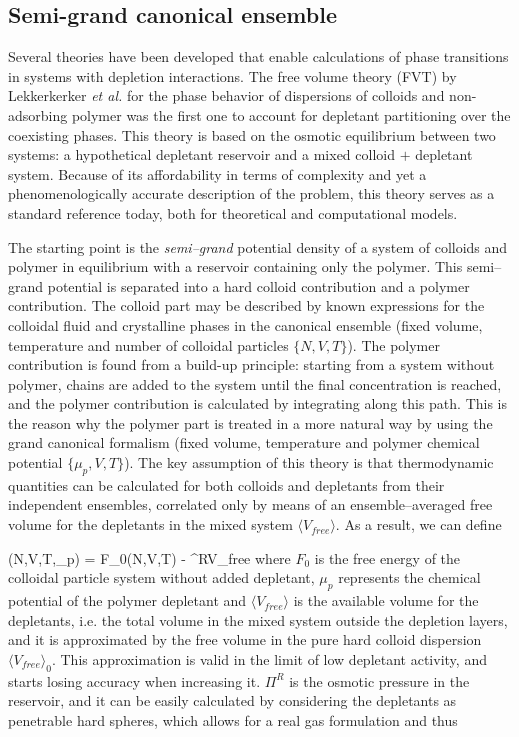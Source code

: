 \subsection{Semi-grand canonical ensemble}

Several theories have been developed that enable calculations of phase transitions in systems with depletion interactions. The free volume theory (FVT) by Lekkerkerker {\em et al.} \cite{sphere+polymer} for the phase behavior of dispersions of colloids and non-adsorbing polymer was the first one to account for depletant partitioning over the coexisting phases. This theory is based on the osmotic equilibrium between two systems: a hypothetical depletant reservoir and a mixed colloid $+$ depletant system. Because of its affordability in terms of complexity and yet a phenomenologically accurate description of the problem, this theory serves as a standard reference today, both for theoretical and computational models.

The starting point is the {\em semi--grand} potential density of a system of colloids and polymer in equilibrium with a reservoir containing only the polymer. This semi--grand potential is separated into a hard colloid contribution and a polymer contribution. The colloid part may be described by known expressions for the colloidal fluid and crystalline phases in the canonical ensemble (fixed volume, temperature and number of colloidal particles $\{N,V,T\}$). The polymer contribution is found from a build-up principle: starting from a system without polymer, chains are added to the system until the final concentration is reached, and the polymer contribution is calculated by integrating along this path. This is the reason why the polymer part is treated in a more natural way by using the grand canonical formalism (fixed volume, temperature and polymer chemical potential $\{\mu_p,V,T\}$). The key assumption of this theory is that thermodynamic quantities can be calculated for both colloids and depletants from their independent ensembles, correlated only by means of an ensemble--averaged free volume for the depletants in the mixed system $\langle V_{free} \rangle$. As a result, we can define

\beq
\Omega(N,V,T,\mu_p) = F_0(N,V,T) - \Pi^R\langle V_{free} \rangle
\eeq
where $F_0$ is the free energy of the colloidal particle system without added depletant, $\mu_p$ represents the chemical potential of the polymer depletant and $\langle V_{free} \rangle$ is the available volume for the depletants, i.e. the total volume in the mixed system outside the depletion layers, and it is approximated by the free volume in the pure hard colloid dispersion $\langle V_{free} \rangle_0$. This approximation is valid in the limit of low depletant activity, and starts losing accuracy when increasing it. $\Pi^R$ is the osmotic pressure in the reservoir, and it can be easily calculated by considering the depletants as penetrable hard spheres, which allows for a real gas formulation and thus


